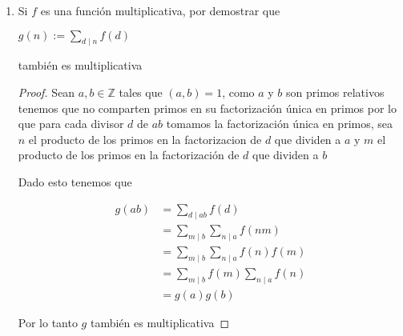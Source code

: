\documentclass[12pt]{article}
\begin{document}
\begin{enumerate}
\begin{itemize}
            
            
        \end{itemize}
        
        
        \item Si $f$ es una función multiplicativa, por demostrar que
        
        \begin{center}
            $g(n) := \sum_{d \mid n} f(d)$
        \end{center}
        
        también es multiplicativa
        
        
        \begin{proof}
        Sean $a,b \in \mathbb{Z}$ tales que $(a,b) = 1$, como $a$ y $b$ son primos relativos tenemos que no comparten primos en su factorización única en primos por lo que para cada divisor $d$ de $ab$ tomamos la factorización única en primos, sea $n$ el producto de los primos en la factorizacion de $d$ que dividen a $a$ y $m$ el producto de los primos en la factorización de $d$ que dividen a $b$
        
        Dado esto tenemos que 
        
        \begin{align*}
            g(ab) &= \sum_{d \mid ab} f(d) \\
                  &= \sum_{m \mid b} \sum_{n \mid a} f(nm) \\
                  &=  \sum_{m \mid b} \sum_{n \mid a} f(n)f(m) \\
                  &=  \sum_{m \mid b} f(m) \sum_{n \mid a} f(n) \\
                  &= g(a)g(b)
        \end{align*}
        
        
        Por lo tanto $g$ también es multiplicativa
        
        \end{proof}
        
    \end{enumerate}
    
\end{document}
